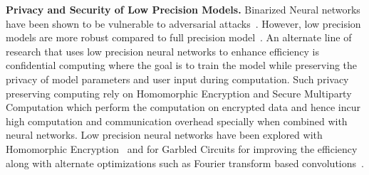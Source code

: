 \noindent\textbf{Privacy and Security of Low Precision Models.} Binarized Neural networks have been shown to be vulnerable to adversarial attacks~\cite{galloway2018attacking,khalil2018combinatorial}.
However, low precision models are more robust compared to full precision model~\cite{lin2018defensive}.
An alternate line of research that uses low precision neural networks to enhance efficiency is confidential computing where the goal is to train the model while preserving the privacy of model parameters and user input during computation.
Such privacy preserving computing rely on Homomorphic Encryption and Secure Multiparty Computation which perform the computation on encrypted data and hence incur high computation and communication overhead specially when combined with neural networks.
Low precision neural networks have been explored with Homomorphic Encryption~\cite{Bourse2017FastHE} and for Garbled Circuits\cite{235489} for improving the efficiency along with alternate optimizations such as Fourier transform based convolutions~\cite{Li2018FALCONAF}.
